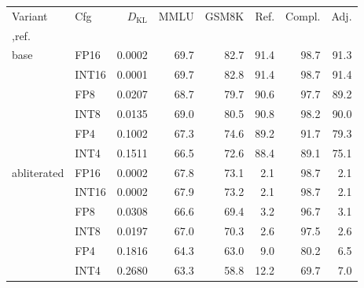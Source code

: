 \setlength{\tabcolsep}{3.5pt}
\begin{tabular}{llrrrrrr}
\toprule
Variant & Cfg & $D_{\mathrm{KL}}$ & MMLU & GSM8K & Ref. & Compl. & Adj.\\,ref. \\
\midrule
base & FP16 & 0.0002 & 69.7 & 82.7 & 91.4 & 98.7 & 91.3 \\
 & INT16 & 0.0001 & 69.7 & 82.8 & 91.4 & 98.7 & 91.4 \\
 & FP8 & 0.0207 & 68.7 & 79.7 & 90.6 & 97.7 & 89.2 \\
 & INT8 & 0.0135 & 69.0 & 80.5 & 90.8 & 98.2 & 90.0 \\
 & FP4 & 0.1002 & 67.3 & 74.6 & 89.2 & 91.7 & 79.3 \\
 & INT4 & 0.1511 & 66.5 & 72.6 & 88.4 & 89.1 & 75.1 \\
\midrule
abliterated & FP16 & 0.0002 & 67.8 & 73.1 & 2.1 & 98.7 & 2.1 \\
 & INT16 & 0.0002 & 67.9 & 73.2 & 2.1 & 98.7 & 2.1 \\
 & FP8 & 0.0308 & 66.6 & 69.4 & 3.2 & 96.7 & 3.1 \\
 & INT8 & 0.0197 & 67.0 & 70.3 & 2.6 & 97.5 & 2.6 \\
 & FP4 & 0.1816 & 64.3 & 63.0 & 9.0 & 80.2 & 6.5 \\
 & INT4 & 0.2680 & 63.3 & 58.8 & 12.2 & 69.7 & 7.0 \\
\bottomrule
\end{tabular}
